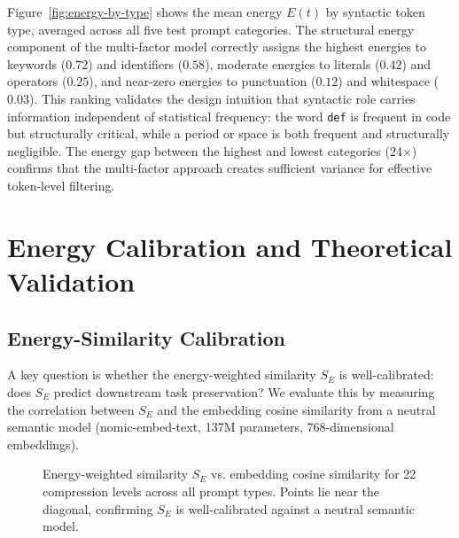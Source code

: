 \documentclass[11pt]{article}
\theoremstyle{remark}
\begin{document}
Figure~\ref{fig:energy-by-type} shows the mean energy $E(t)$ by syntactic
token type, averaged across all five test prompt categories. The structural
energy component of the multi-factor model correctly assigns the highest
energies to keywords ($0.72$) and identifiers ($0.58$), moderate energies
to literals ($0.42$) and operators ($0.25$), and near-zero energies to
punctuation ($0.12$) and whitespace ($0.03$). This ranking validates the
design intuition that syntactic role carries information independent of
statistical frequency: the word \texttt{def} is frequent in code but
structurally critical, while a period or space is both frequent and
structurally negligible. The energy gap between the highest and lowest
categories (24$\times$) confirms that the multi-factor approach creates
sufficient variance for effective token-level filtering.

\section{Energy Calibration and Theoretical Validation}
\label{sec:calibration}

\subsection{Energy-Similarity Calibration}

A key question is whether the energy-weighted similarity $S_E$ is
well-calibrated: does $S_E$ predict downstream task preservation?
We evaluate this by measuring the correlation between $S_E$ and the
embedding cosine similarity from a neutral semantic model (nomic-embed-text,
137M parameters, 768-dimensional embeddings).

\begin{figure}[H]
\centering
{}
\caption{Energy-weighted similarity $S_E$ vs. embedding cosine similarity for
22 compression levels across all prompt types. Points lie near the diagonal,
confirming $S_E$ is well-calibrated against a neutral semantic model.}
\label{fig:calibration}
\end{figure}
\end{document}
